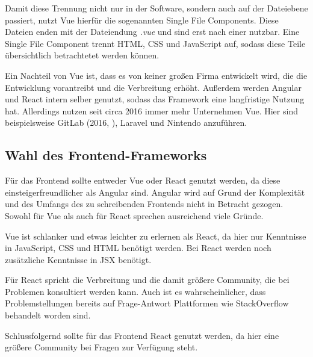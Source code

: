 Damit diese Trennung nicht nur in der Software, sondern auch auf der Dateiebene passiert, nutzt Vue hierfür die sogenannten Single File Components. Diese Dateien enden mit der Dateiendung \textit{.vue} und sind erst nach einer  nutzbar. Eine Single File Component trennt HTML, CSS und JavaScript auf, sodass diese Teile übersichtlich betrachtetet werden können. \cite{teufelVueJsTutorial2018a}

Ein Nachteil von Vue ist, dass es von keiner großen Firma entwickelt wird, die die Entwicklung vorantreibt und die Verbreitung erhöht. Außerdem werden Angular und React intern selber genutzt, sodass das Framework eine langfristige Nutzung hat. Allerdings nutzen seit circa 2016 immer mehr Unternehmen Vue. Hier sind beispielsweise GitLab (2016, \cite{schatzWhyWeChose2016}), Laravel und Nintendo anzuführen. \cite{techuzTopWebsitesBuilt2018}

\subsection{Wahl des Frontend-Frameworks}

Für das Frontend sollte entweder Vue oder React genutzt werden, da diese einsteigerfreundlicher als Angular sind. Angular wird auf Grund der Komplexität und des Umfangs des zu schreibenden Frontends nicht in Betracht gezogen. Sowohl für Vue als auch für React sprechen ausreichend viele Gründe.

Vue ist schlanker und etwas leichter zu erlernen als React, da hier nur Kenntnisse in \linebreak JavaScript, CSS und HTML benötigt werden. Bei React werden noch zusätzliche Kenntnisse in JSX benötigt.

Für React spricht die Verbreitung und die damit größere Community, die bei Problemen konsultiert werden kann. Auch ist es wahrscheinlicher, dass Problemstellungen bereits auf Frage-Antwort Plattformen wie StackOverflow behandelt worden sind. 

Schlussfolgernd sollte für das Frontend React genutzt werden, da hier eine größere Community bei Fragen zur Verfügung steht.
